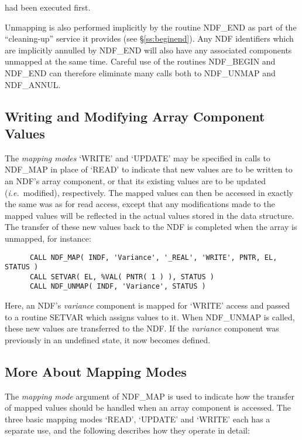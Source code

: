 \documentclass[twoside,11pt]{article}
\newcommand{\htmlref}[2]{#1}
\newcommand{\xlabel}[1]{}
\newcommand{\st}[1]{{\em{#1}}}
\begin{document}
had been executed first.

Unmapping is also performed implicitly by the routine \htmlref{NDF\_END}{NDF_END} as part of
the ``cleaning-up'' service it provides (see \S\ref{ss:beginend}). 
Any NDF identifiers which are implicitly annulled by NDF\_END will also have
any associated components unmapped at the same time. 
Careful use of the routines \htmlref{NDF\_BEGIN}{NDF_BEGIN} and NDF\_END can therefore eliminate many
calls  both to NDF\_UNMAP and NDF\_ANNUL. 

\subsection{\xlabel{writing_and_modifying_array_component_values}\label{ss:writingandmodifying}Writing and Modifying Array Component Values}

The \st{mapping modes\/} `WRITE' and `UPDATE' may be specified in calls to
\htmlref{NDF\_MAP}{NDF_MAP} in place of `READ' to indicate that new values are to be written to
an NDF's array component, or that its existing values are to be updated
(\st{i.e.}\ modified), respectively. 
The mapped values can then be accessed in exactly the same was as for read
access, except that any modifications made to the mapped values will be
reflected in the actual values stored in the data structure. 
The transfer of these new values back to the NDF is completed when the
array is unmapped, for instance:

\small
\begin{verbatim}
      CALL NDF_MAP( INDF, 'Variance', '_REAL', 'WRITE', PNTR, EL, STATUS )
      CALL SETVAR( EL, %VAL( PNTR( 1 ) ), STATUS )
      CALL NDF_UNMAP( INDF, 'Variance', STATUS )
\end{verbatim}
\normalsize

Here, an NDF's \st{variance\/} component is mapped for `WRITE' access and 
passed to a routine SETVAR which assigns values to it.
When \htmlref{NDF\_UNMAP}{NDF_UNMAP} is called, these new values are transferred to the NDF.
If the \st{variance\/} component was previously in an undefined state, it now
becomes defined. 

\subsection{\xlabel{more_about_mapping_modes}\label{ss:moreaboutmapping}More About Mapping Modes}

The \st{mapping mode\/} argument of \htmlref{NDF\_MAP}{NDF_MAP} is used to
indicate how the transfer of mapped values should be handled when an array 
component is accessed.
The three basic mapping modes `READ', `UPDATE' and `WRITE' each has a
separate use, and the following describes how they operate in detail: 
\end{document}
